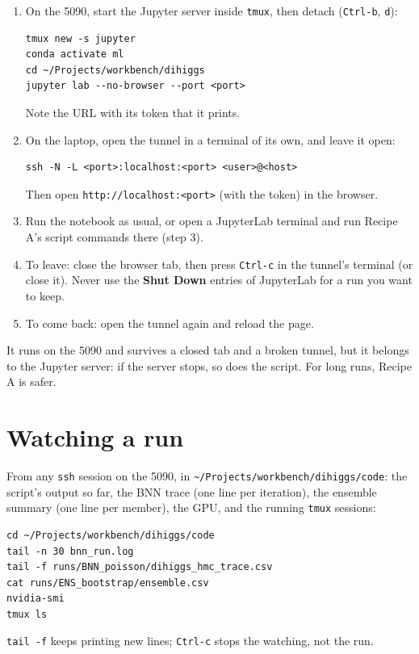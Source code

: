 \documentclass[11pt]{article}
\newcommand{\file}[1]{\nolinkurl{#1}}
\newcommand{\code}[1]{\texttt{#1}}
\begin{document}
\begin{enumerate}
  \item On the 5090, start the Jupyter server inside \code{tmux}, then detach
    (\code{Ctrl-b}, \code{d}):
\begin{lstlisting}[style=sh]
tmux new -s jupyter
conda activate ml
cd ~/Projects/workbench/dihiggs
jupyter lab --no-browser --port <port>
\end{lstlisting}
    Note the URL with its token that it prints.
  \item On the laptop, open the tunnel in a terminal of its own, and leave it open:
\begin{lstlisting}[style=sh]
ssh -N -L <port>:localhost:<port> <user>@<host>
\end{lstlisting}
    Then open \code{http://localhost:<port>} (with the token) in the browser.
  \item Run the notebook as usual, or open a JupyterLab terminal and run Recipe A's
    script commands there (step 3).
  \item To leave: close the browser tab, then press \code{Ctrl-c} in the tunnel's
    terminal (or close it). Never use the \textbf{Shut Down} entries of JupyterLab for a
    run you want to keep.
  \item To come back: open the tunnel again and reload the page.
\end{enumerate}

\begin{watch}
It runs on the 5090 and survives a closed tab and a broken tunnel, but it belongs to the
Jupyter server: if the server stops, so does the script. For long runs, Recipe A is safer.
\end{watch}

\section{Watching a run}

From any \code{ssh} session on the 5090, in \file{~/Projects/workbench/dihiggs/code}: the
script's output so far, the BNN trace (one line per iteration), the ensemble summary (one
line per member), the GPU, and the running \code{tmux} sessions:
\begin{lstlisting}[style=sh]
cd ~/Projects/workbench/dihiggs/code
tail -n 30 bnn_run.log
tail -f runs/BNN_poisson/dihiggs_hmc_trace.csv
cat runs/ENS_bootstrap/ensemble.csv
nvidia-smi
tmux ls
\end{lstlisting}
\noindent \code{tail -f} keeps printing new lines; \code{Ctrl-c} stops the watching, not
the run.
\end{document}

